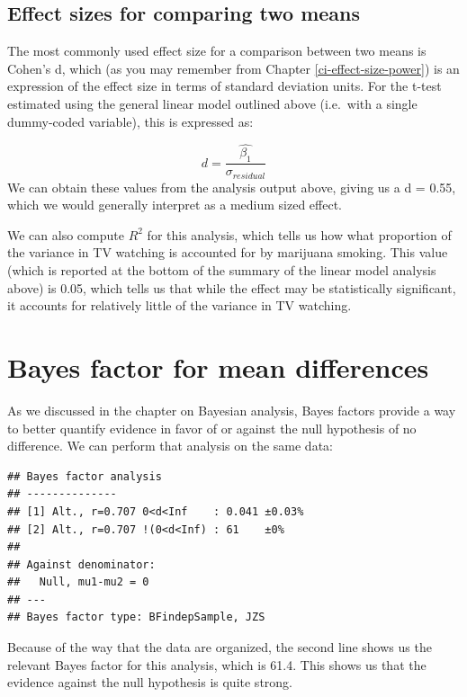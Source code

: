 \documentclass[12pt,]{book}
\theoremstyle{definition}
\theoremstyle{definition}
\theoremstyle{definition}
\theoremstyle{remark}
\begin{document}
\hypertarget{effect-sizes-for-comparing-two-means}{%
\subsection{Effect sizes for comparing two means}\label{effect-sizes-for-comparing-two-means}}

The most commonly used effect size for a comparison between two means is Cohen's d, which (as you may remember from Chapter \ref{ci-effect-size-power}) is an expression of the effect size in terms of standard deviation units. For the t-test estimated using the general linear model outlined above (i.e.~with a single dummy-coded variable), this is expressed as:

\[
d = \frac{\hat{\beta_1}}{\sigma_{residual}}
\]
We can obtain these values from the analysis output above, giving us a d = 0.55, which we would generally interpret as a medium sized effect.

We can also compute \(R^2\) for this analysis, which tells us how what proportion of the variance in TV watching is accounted for by marijuana smoking. This value (which is reported at the bottom of the summary of the linear model analysis above) is 0.05, which tells us that while the effect may be statistically significant, it accounts for relatively little of the variance in TV watching.

\hypertarget{bayes-factor-for-mean-differences}{%
\section{Bayes factor for mean differences}\label{bayes-factor-for-mean-differences}}

As we discussed in the chapter on Bayesian analysis, Bayes factors provide a way to better quantify evidence in favor of or against the null hypothesis of no difference. We can perform that analysis on the same data:

\begin{verbatim}
## Bayes factor analysis
## --------------
## [1] Alt., r=0.707 0<d<Inf    : 0.041 ±0.03%
## [2] Alt., r=0.707 !(0<d<Inf) : 61    ±0%
## 
## Against denominator:
##   Null, mu1-mu2 = 0 
## ---
## Bayes factor type: BFindepSample, JZS
\end{verbatim}

Because of the way that the data are organized, the second line shows us the relevant Bayes factor for this analysis, which is 61.4. This shows us that the evidence against the null hypothesis is quite strong.
\end{document}
